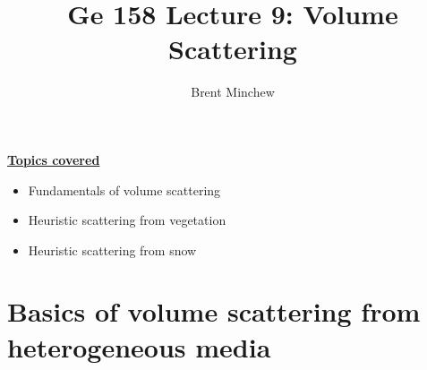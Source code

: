 \documentclass[11pt, oneside]{article}
\title{Ge 158 Lecture 9: Volume Scattering}
\author{Brent Minchew}
\date{}
\begin{document}
\maketitle

\noindent\underline{\textbf{Topics covered}}
\begin{itemize}
	\item Fundamentals of volume scattering
	\item Heuristic scattering from vegetation
	\item Heuristic scattering from snow
\end{itemize}

\section{Basics of volume scattering from heterogeneous media}
\label{s:basics}
\end{document}
